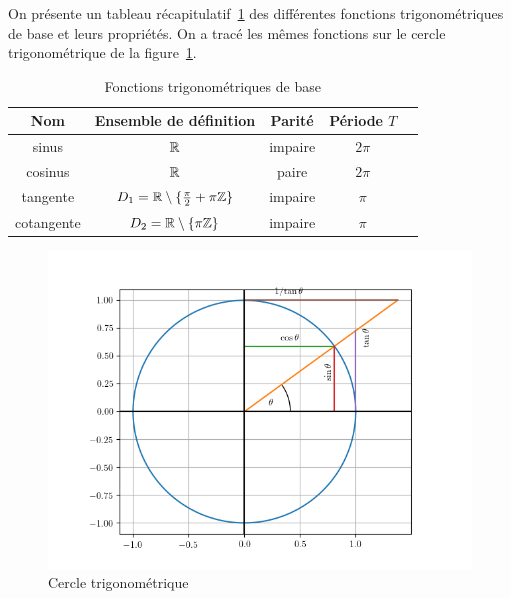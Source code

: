 On présente un tableau récapitulatif~\ref{tab:fonctiontrigo} des différentes fonctions trigonométriques de base et leurs propriétés. On a tracé les mêmes fonctions sur le cercle trigonométrique de la figure~\ref{fig:cercletrigo}.
\begin{table}
  \centering
  \begin{tabular}{|c|c|c|c|c|}
    \hline
    Nom & Ensemble de définition & Parité & Période \(T\) \\ \hline
    sinus & \(\mathbb{R}\) & impaire & \(2\pi\) \\
    cosinus & \(\mathbb{R}\) & paire & \(2\pi\) \\
    tangente & \(D_1=\mathbb{R}\setminus\{\frac{\pi}{2}+\pi \mathbb{Z}\}\) & impaire & \(\pi\) \\
    cotangente & \(D_2=\mathbb{R}\setminus\{\pi \mathbb{Z}\}\) & impaire & \(\pi\) \\ \hline
  \end{tabular}
  \caption{Fonctions trigonométriques de base}
  \label{tab:fonctiontrigo}
\end{table}

\begin{figure}
\centering
\includegraphics[scale=0.8]{./CercleTrigo.png}
\caption{Cercle trigonométrique}
\label{fig:cercletrigo}
\end{figure}


